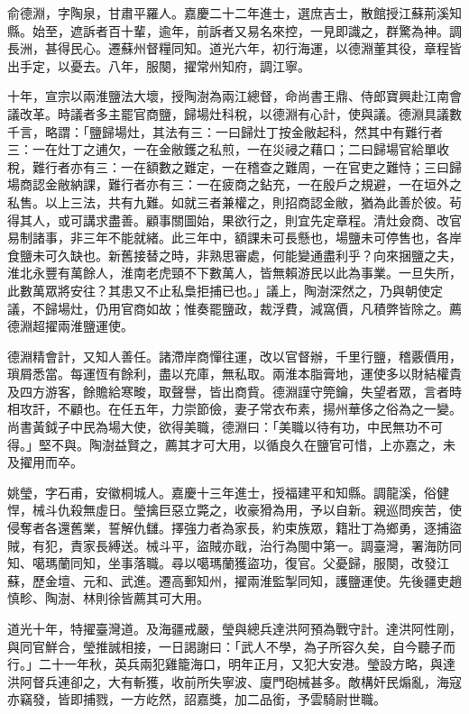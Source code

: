 \begin{pinyinscope}
俞德淵，字陶泉，甘肅平羅人。嘉慶二十二年進士，選庶吉士，散館授江蘇荊溪知縣。始至，遮訴者百十輩，逾年，前訴者又易名來控，一見即識之，群驚為神。調長洲，甚得民心。遷蘇州督糧同知。道光六年，初行海運，以德淵董其役，章程皆出手定，以憂去。八年，服闋，擢常州知府，調江寧。

十年，宣宗以兩淮鹽法大壞，授陶澍為兩江總督，命尚書王鼎、侍郎寶興赴江南會議改革。時議者多主罷官商鹽，歸場灶科稅，以德淵有心計，使與議。德淵具議數千言，略謂：「鹽歸場灶，其法有三：一曰歸灶丁按金敝起科，然其中有難行者三：一在灶丁之逋欠，一在金敝鑊之私煎，一在災祲之藉口；二曰歸場官給單收稅，難行者亦有三：一在額數之難定，一在稽查之難周，一在官吏之難恃；三曰歸場商認金敝納課，難行者亦有三：一在疲商之鉆充，一在殷戶之規避，一在垣外之私售。以上三法，共有九難。如就三者兼權之，則招商認金敝，猶為此善於彼。茍得其人，或可講求盡善。顧事關圖始，果欲行之，則宜先定章程。清灶僉商、改官易制諸事，非三年不能就緒。此三年中，額課未可長懸也，場鹽未可停售也，各岸食鹽未可久缺也。新舊接替之時，非熟思審處，何能變通盡利乎？向來捆鹽之夫，淮北永豐有萬餘人，淮南老虎頸不下數萬人，皆無賴游民以此為事業。一旦失所，此數萬眾將安往？其患又不止私梟拒捕已也。」議上，陶澍深然之，乃與朝使定議，不歸場灶，仍用官商如故；惟奏罷鹽政，裁浮費，減窩價，凡積弊皆除之。薦德淵超擢兩淮鹽運使。

德淵精會計，又知人善任。諸滯岸商憚往運，改以官督辦，千里行鹽，稽覈價用，瑣屑悉當。每運恆有餘利，盡以充庫，無私取。兩淮本脂膏地，運使多以財結權貴及四方游客，餘贍給寒畯，取聲譽，皆出商貲。德淵謹守筦鑰，失望者眾，言者時相攻訐，不顧也。在任五年，力崇節儉，妻子常衣布素，揚州華侈之俗為之一變。尚書黃鉞子中民為場大使，欲得美職，德淵曰：「美職以待有功，中民無功不可得。」堅不與。陶澍益賢之，薦其才可大用，以循良久在鹽官可惜，上亦嘉之，未及擢用而卒。

姚瑩，字石甫，安徽桐城人。嘉慶十三年進士，授福建平和知縣。調龍溪，俗健悍，械斗仇殺無虛日。瑩擒巨惡立斃之，收豪猾為用，予以自新。親巡問疾苦，使侵奪者各還舊業，誓解仇讎。擇強力者為家長，約束族眾，籍壯丁為鄉勇，逐捕盜賊，有犯，責家長縛送。械斗平，盜賊亦戢，治行為閩中第一。調臺灣，署海防同知、噶瑪蘭同知，坐事落職。尋以噶瑪蘭獲盜功，復官。父憂歸，服闋，改發江蘇，歷金壇、元和、武進。遷高郵知州，擢兩淮監掣同知，護鹽運使。先後疆吏趙慎畛、陶澍、林則徐皆薦其可大用。

道光十年，特擢臺灣道。及海疆戒嚴，瑩與總兵達洪阿預為戰守計。達洪阿性剛，與同官鮮合，瑩推誠相接，一日謁謝曰：「武人不學，為子所容久矣，自今聽子而行。」二十一年秋，英兵兩犯雞籠海口，明年正月，又犯大安港。瑩設方略，與達洪阿督兵連卻之，大有斬獲，收前所失寧波、廈門砲械甚多。敵構奸民煽亂，海寇亦竊發，皆即捕戮，一方屹然，詔嘉獎，加二品銜，予雲騎尉世職。


\end{pinyinscope}
